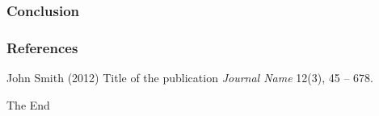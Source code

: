 \documentclass{beamer}
\begin{document}
\begin{frame}
\frametitle{Conclusion}
\end{frame}



\begin{frame}
\frametitle{References}
\footnotesize{
\begin{thebibliography}{99} %
 John Smith (2012)
\newblock Title of the publication
\newblock \emph{Journal Name} 12(3), 45 -- 678.
\end{thebibliography}
}
\end{frame}


\begin{frame}
\Huge{\centerline{The End}}
\end{frame}

\end{document}
